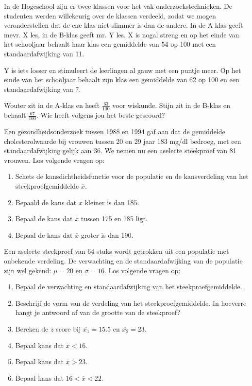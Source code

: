 {\begin{exercise}
  In de  Hogeschool zijn er twee klassen voor het vak onderzoekstechnieken. De studenten werden willekeurig over de klassen verdeeld, zodat we mogen veronderstellen dat de ene klas niet slimmer is dan de andere. In de A-klas geeft mevr. X les, in de B-klas geeft mr. Y les. X is nogal streng en op het einde van het schooljaar behaalt haar klas een gemiddelde van 54 op 100 met een standaardafwijking van 11.

  Y is iets losser en stimuleert de leerlingen al gauw met een puntje meer. Op het einde van het schooljaar behaalt zijn klas een gemiddelde van 62 op 100 en een standaardafwijking van 7.

  Wouter zit in de A-klas en heeft $\frac{63}{100}$ voor wiskunde. Stijn zit in de B-klas en behaalt $\frac{67}{100}$. Wie heeft volgens jou het beste gescoord?
\end{exercise}

\begin{exercise}
  Een gezondheidsonderzoek tussen 1988 en 1994 gaf aan dat de gemiddelde cholesterolwaarde bij vrouwen tussen 20 en 29 jaar 183 mg/dl bedroeg, met een standaardafwijking gelijk aan 36. We nemen nu een aselecte steekproef van 81 vrouwen. Los volgende vragen op:
  
  \begin{enumerate}[label=\alph*.]
    \item Schets de kansdichtheidsfunctie voor de populatie en de kansverdeling van het steekproefgemiddelde $\overline{x}$.
    \item Bepaald de kans dat $\overline{x}$ kleiner is dan 185.
    \item Bepaal de kans dat $\overline{x}$ tussen 175 en 185 ligt.
    \item Bepaal de kans dat $\overline{x}$ groter is dan 190. 
  \end{enumerate}
\end{exercise}

\begin{exercise}
  Een aselecte steekproef van 64 stuks wordt getrokken uit een populatie met onbekende verdeling. De verwachting en de standaardafwijking van de populatie
  zijn wel gekend: $\mu = 20$ en $\sigma=16$. Los volgende vragen op:
  
  \begin{enumerate}[label=\alph*.]
    \item Bepaal de verwachting en standaardafwijking van het steekproefgemiddelde.
    \item Beschrijf de vorm van de verdeling van het steekproefgemiddelde. In hoeverre hangt je antwoord af van de grootte van de steekproef?
    \item Bereken de $z$ score bij $\overline{x_{1}} = 15.5$ en $\overline{x_{2}} = 23$.
    \item Bepaal kans dat $\overline{x} <16$.
    \item Bepaal kans dat $\overline{x} > 23$.
    \item Bepaal kans dat $16< \overline{x}< 22$.
  \end{enumerate}
\end{exercise}

}
